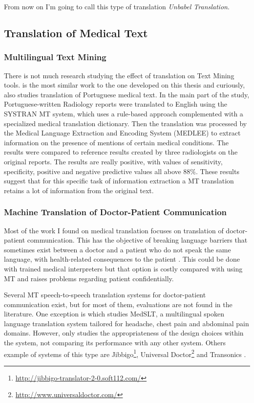 From now on I'm going to call this type of translation \textit{Unbabel Translation}.


\subsection{Translation of Medical Text}

\subsubsection{Multilingual Text Mining}
\label{multilingual-text-mining}

There is not much research studying the effect of translation on Text Mining tools. \citep{Castilla2007a} is the most similar work to the one developed on this thesis and curiously, also studies translation of Portuguese medical text. In the main part of the study, Portuguese-written Radiology reports were translated to English using the SYSTRAN MT system, which uses a rule-based approach complemented with a specialized medical translation dictionary. Then the translation was processed by the Medical Language Extraction and Encoding System (MEDLEE) to extract information on the presence of mentions of certain medical conditions. The results were compared to reference results created by three radiologists on the original reports. The results are really positive, with values of sensitivity, specificity, positive and negative predictive values all above 88\%. These results suggest that for this specific task of information extraction a MT translation retains a lot of information from the original text.


\subsubsection{Machine Translation of Doctor-Patient Communication}

Most of the work I found on medical translation focuses on translation of doctor-patient communication. This has the objective of breaking language barriers that sometimes exist between a doctor and a patient who do not speak the same language, with health-related consequences to the patient \citep{Schyve2007}. This could be done with trained medical interpreters but that option is costly compared with using MT and raises problems regarding patient confidentially.

Several MT speech-to-speech translation systems for doctor-patient communication exist, but for most of them, evaluations are not found in the literature. One exception is \citep{Bouillon2005} which studies MedSLT, a multilingual spoken language translation system tailored for headache, chest pain and abdominal pain domains. However, \citep{Bouillon2005} only studies the appropriateness of the design choices within the system, not comparing its performance with any other system. Others example of systems of this type are Jibbigo\footnote{\url{http://jibbigo-translator-2-0.soft112.com/}}, Universal Doctor\footnote{\url{http://www.universaldoctor.com/}} and Transonics \citep{Nagata2005}.

